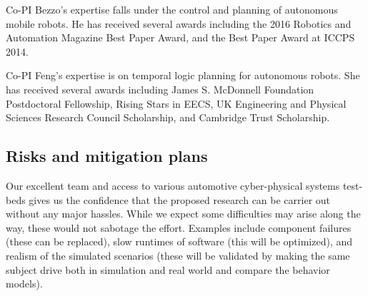 Co-PI Bezzo's expertise falls under the control and planning of autonomous mobile robots. 
He has received several awards including the 2016 Robotics and Automation Magazine Best Paper Award, and the Best Paper Award at ICCPS 2014.

Co-PI Feng's expertise is on temporal logic planning for autonomous robots. She has received several awards including James S. McDonnell Foundation Postdoctoral Fellowship, Rising Stars in EECS, UK Engineering and Physical Sciences Research Council Scholarship, and Cambridge Trust Scholarship.




\vspace{-8pt}
\subsection{Risks and mitigation plans}

Our excellent team and access to various automotive cyber-physical systems test-beds gives us the confidence that the proposed research can be carrier out without any major hassles. While we expect some difficulties may arise along the way, these would not sabotage the effort. Examples include component failures (these can be replaced), slow runtimes of software (this will be optimized), and realism of the simulated scenarios (these will be validated by making the same subject drive both in simulation and real world and compare the behavior models). 
\vspace{-12pt}
